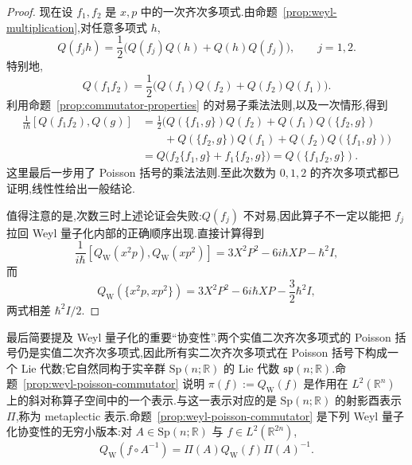 {\begin{proof}
现在设 $f_1,f_2$ 是 $x,p$ 中的一次齐次多项式.由命题~\ref{prop:weyl-multiplication},对任意多项式 $h$,
\[
Q(f_jh)=\frac12\bigl(Q(f_j)Q(h)+Q(h)Q(f_j)\bigr),
\qquad j=1,2.
\label{eq:weyl-degree1-product}
\]
特别地,
\[
Q(f_1f_2)=\frac12\bigl(Q(f_1)Q(f_2)+Q(f_2)Q(f_1)\bigr).
\]
利用命题~\ref{prop:commutator-properties} 的对易子乘法法则,以及一次情形,得到
\[
\begin{aligned}
\frac1{i\hbar}[Q(f_1f_2),Q(g)]
&=\frac12\bigl(Q(\{f_1,g\})Q(f_2)+Q(f_1)Q(\{f_2,g\})\\
&\qquad+Q(\{f_2,g\})Q(f_1)+Q(f_2)Q(\{f_1,g\})\bigr)\\
&=Q\bigl(f_2\{f_1,g\}+f_1\{f_2,g\}\bigr)
=Q(\{f_1f_2,g\}).
\end{aligned}
\]
这里最后一步用了 Poisson 括号的乘法法则.至此次数为 $0,1,2$ 的齐次多项式都已证明,线性性给出一般结论.

值得注意的是,次数三时上述论证会失败:$Q(f_j)$ 不对易,因此算子不一定以能把 $f_j$ 拉回 Weyl 量子化内部的正确顺序出现.直接计算得到
\[
\frac1{i\hbar}[Q_{\mathrm W}(x^2p),Q_{\mathrm W}(xp^2)]
=3X^2P^2-6i\hbar XP-\hbar^2I,
\]
而
\[
Q_{\mathrm W}(\{x^2p,xp^2\})
=3X^2P^2-6i\hbar XP-\frac32\hbar^2I,
\]
两式相差 $\hbar^2I/2$.
\end{proof}

最后简要提及 Weyl 量子化的重要“协变性”.两个实值二次齐次多项式的 Poisson 括号仍是实值二次齐次多项式,因此所有实二次齐次多项式在 Poisson 括号下构成一个 Lie 代数;它自然同构于实辛群 $\mathrm{Sp}(n;\mathbb R)$ 的 Lie 代数 $\mathfrak{sp}(n;\mathbb R)$.命题~\ref{prop:weyl-poisson-commutator} 说明 $\pi(f):=Q_{\mathrm W}(f)$ 是作用在 $L^2(\mathbb R^n)$ 上的斜对称算子空间中的一个表示.与这一表示对应的是 $\mathrm{Sp}(n;\mathbb R)$ 的射影酉表示 $\Pi$,称为 metaplectic 表示.命题~\ref{prop:weyl-poisson-commutator} 是下列 Weyl 量子化协变性的无穷小版本:对 $A\in\mathrm{Sp}(n;\mathbb R)$ 与 $f\in L^2(\mathbb R^{2n})$,
\[
Q_{\mathrm W}(f\circ A^{-1})=\Pi(A)Q_{\mathrm W}(f)\Pi(A)^{-1}.
\]

}

